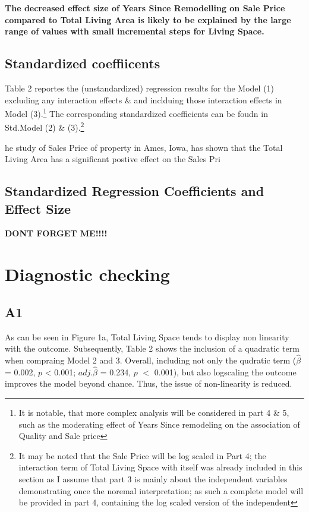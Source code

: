 \documentclass[a4paper]{article}
\begin{document}
\textbf{The decreased effect size of Years Since Remodelling on Sale Price compared to Total Living Area is likely to be explained by the large range of values with small incremental steps for Living Space.}



\subsection{Standardized coeffiicents}




Table 2 reportes the (unstandardized) regression results for the Model (1) excluding any interaction effects \& and inclduing those interaction effects in Model (3).\footnote{It is notable, that more complex analysis will be considered in part 4 \& 5, such as the moderating effect of Years Since remodeling on the association of Quality and Sale price} The corresponding standardized coefficients can be foudn in Std.Model (2) \& (3).\footnote{It may be noted that the Sale Price will be log scaled in Part 4; the interaction term of Total Living Space with itself was already included in this section as I assume that part 3 is mainly about the independent variables demonstrating once the noremal interpretation; as such a complete model will be provided in part 4, containing the log scaled version of the independent}





he study of Sales Price of property in Ames, Iowa, has shown that the Total Living Area has a significant postive effect on the Sales Pri



\subsection{Standardized Regression Coefficients and Effect Size}


\textbf{DONT FORGET ME!!!!}







\section{Diagnostic checking}
\subsection{A1}
As can be seen in Figure 1a, Total Living Space tends to display non linearity with the outcome. Subsequently, Table 2 shows the inclusion of a quadratic term when compraing Model 2 and 3. Overall, including not only the qudratic term ($\hat{\beta}$ = 0.002, $p$ < 0.001; $adj.\hat{\beta}$ = 0.234, $p$ $<$	 0.001), but also logscaling the outcome improves the model beyond chance. Thus, the issue of non-linearity is reduced.
\end{document}
